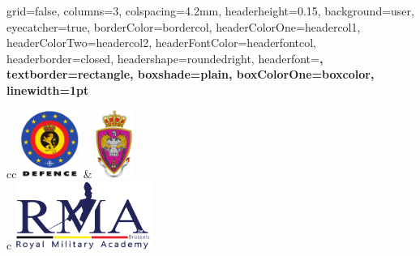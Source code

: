 \documentclass[a0paper,portrait]{baposter}
\begin{document}
	\begin{poster}{
			grid=false,
			columns=3, %
			colspacing=4.2mm, %
			headerheight=0.15\textheight, %
			background=user, %
			eyecatcher=true, %
			borderColor=bordercol, %
			headerColorOne=headercol1, %
			headerColorTwo=headercol2,
			headerFontColor=headerfontcol,
			headerborder=closed, %
			headershape=roundedright, %
			headerfont=\Large\sf\bf,
			textborder=rectangle,
			boxshade=plain,
			boxColorOne=boxcolor, %
			linewidth=1pt
		}
		{
			\setlength{\tabcolsep}{2pt}
			\begin{tabular}{cc}
				\includegraphics[height=6em]{DEFENCE-LogoColor-TextBlack-print} & \includegraphics[height=6em]{logo_irsd} \\
				 {c} {\includegraphics[height=6em]{Logo_RMA}}
			\end{tabular}
		}

\end{poster}
\end{document}
